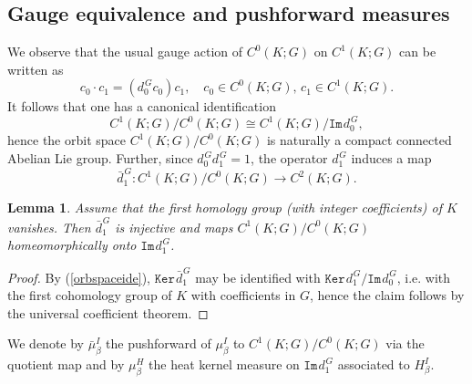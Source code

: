 \documentclass[11pt,reqno]{amsart}
\numberwithin{equation}{section}
\newtheorem{lemma}[theorem]{Lemma}
\theoremstyle{remark}
\theoremstyle{rmdefinition}
\begin{document}
\subsection{Gauge equivalence and pushforward measures}\label{gaueqipussec}
We observe that the usual gauge action of $C^0(K;G)$ on $C^1(K;G)$ can be written as
$$ c_0 \cdot c_1 = (d_0^{\hspace{1pt}G}c_0)c_1, \quad c_0 \in C^0(K;G),\,
c_1 \in C^1(K;G).$$
It follows that one has a canonical identification 
\begin{equation}\label{orbspaceide}
 C^1(K;G)/C^0(K;G) \cong C^1(K;G)/\mathtt{Im}\hspace{1pt}d_0^{\hspace{1pt}G},
\end{equation} 
hence the orbit space  $C^1(K;G)/C^0(K;G)$ is naturally a compact connected Abelian Lie group. Further, since $d_0^{\hspace{1pt}G} d_1^{\hspace{1pt}G}=1$, the operator $d_1^{\hspace{1pt}G}$ induces a map
\begin{equation}\label{mapindbyd}
\bar{d}_1^{\hspace{1pt}G}: C^1(K;G)/C^0(K;G) \to C^2(K;G).
\end{equation} 
\begin{lemma}\label{injofdone} Assume that the first homology group (with integer coefficients) of $K$ vanishes. Then  $\bar{d}_1^{\hspace{1pt}G}$ is injective and maps $C^1(K;G)/C^0(K;G)$ homeomorphically onto $\mathtt{Im}\hspace{1pt}d_1^{\hspace{1pt}G}$.
\end{lemma}
\begin{proof}
By (\ref{orbspaceide}), $\mathtt{Ker}\hspace{1pt}\bar{d}_1^{\hspace{1pt}G}$ 
may be identified with 
$\mathtt{Ker}\hspace{1pt}d_1^{\hspace{1pt}G}
/\mathtt{Im}\hspace{1pt}d_0^{\hspace{1pt}G}$, i.e. with the first cohomology group of $K$ with coefficients in $G$, hence the claim follows by the universal coefficient theorem.
\end{proof}
 We denote  by $\bar{\mu}^I_{\beta}$  the pushforward of $\mu^I_{\beta}$ to $C^1(K;G)/C^0(K;G)$ via the quotient map and by $\mu^H_{\beta}$ the heat kernel measure on $\mathtt{Im}\hspace{1pt}d_1^{\hspace{1pt}G}$ associated to $H^I_{\beta}$.
\end{document}
